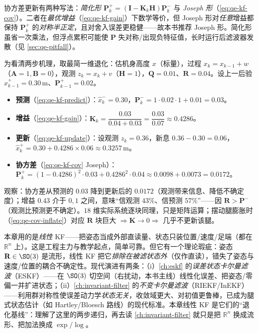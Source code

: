 \begin{note}\label{note:qe-joseph}
协方差更新有两种写法：\emph{简化形} $\mathbf{P}_k^+=(\mathbf{I}-\mathbf{K}_k\mathbf{H})\mathbf{P}_k^-$ 与 \emph{Joseph 形}（\cref{eq:qe-kf-cov}）。二者在\emph{最优增益}（\cref{eq:qe-kf-gain}）下数学等价，但 Joseph 形对\emph{任意}增益都保持 $\mathbf{P}_k^+$ 的\emph{对称半正定}，且对舍入误差更稳健——故本书推荐 Joseph 形。简化形虽省一次乘法，但浮点累积可能使 $\mathbf{P}$ 失对称/出现负特征值，长时运行后滤波器发散（见 \cref{sec:qe-pitfall}）。
\end{note}

\begin{example}\label{exam:qe-kf-step}
为看清两步机理，取最简一维退化：估机身高度 $x$（标量），过程 $x_k=x_{k-1}+w$（$\mathbf{A}=1,\mathbf{B}=0$），观测 $z_k=x_k+v$（$\mathbf{H}=1$），$\mathbf{Q}=0.01$、$\mathbf{R}=0.04$。设上一后验 $\hat x_{k-1}^+=0.30\,\mathrm{m}$、$\mathbf{P}_{k-1}^+=0.02$。
\begin{itemize}
  \item \textbf{预测}（\cref{eq:qe-kf-predict}）：$\hat x_k^-=0.30$，$\mathbf{P}_k^-=1\cdot0.02\cdot1+0.01=0.03$。
  \item \textbf{增益}（\cref{eq:qe-kf-gain}）：$\mathbf{K}_k=\dfrac{0.03}{0.04+0.03}=\dfrac{0.03}{0.07}\approx0.4286$。
  \item \textbf{更新}（\cref{eq:qe-kf-update}）：设观测 $z_k=0.36$，新息 $0.36-0.30=0.06$，$\hat x_k^+=0.30+0.4286\times0.06\approx0.3257\,\mathrm{m}$。
  \item \textbf{协方差}（\cref{eq:qe-kf-cov} Joseph）：$\mathbf{P}_k^+=(1-0.4286)^2\cdot0.03+0.4286^2\cdot0.04\approx0.0098+0.0073=0.0172$。
\end{itemize}
观察：协方差从预测的 $0.03$ 降到更新后的 $0.0172$（观测带来信息、降低不确定度）；增益 $0.43$ 介于 $0,1$ 之间，意味“信观测 $43\%$、信预测 $57\%$”——因 $\mathbf{R}>\mathbf{P}^-$（观测比预测更不确定）。$18$ 维实际系统逐块同理，只是矩阵运算；摆动腿膨胀时（\cref{eq:qe-cov-inflate}）对应 $\mathbf{R}$ 块巨大 $\Rightarrow\mathbf{K}\to0\Rightarrow$ 几乎不更新该腿。
\end{example}

\begin{insight}\label{ins:qe-inekf}
本章用的是\emph{线性} KF——把姿态当成外部直读量、状态只装位置/速度/足端（都在 $\mathbb{R}^n$ 上）。这是工程主力与教学起点，简单可靠。但它有一个理论瑕疵：姿态 $\mathbf{R}\in\SO(3)$ 是流形，线性 KF 把它\emph{排除在被滤状态外}（仅作直读），错失了姿态与速度/位置的耦合不确定性。现代演进有两条：（i）\cref{ch:eskf} 的\emph{误差状态卡尔曼滤波}（ESKF）——在 $\SO(3)$ 切空间（右扰动，本书主线）线性化误差、把姿态/零偏一并扩进状态；（ii）\cref{ch:invariant-filter} 的\emph{不变卡尔曼滤波}（RIEKF/InEKF）——利用群对称性使误差动力学\emph{状态无关}，收敛域更大、对初值更鲁棒，已成为腿式状态估计（如 Hartley/Bloesch 路线\cite{bloesch2013state}）的现代标准。本章线性 KF 是它们的“退化基线”：理解了这里的两步递归，再去读 \cref{ch:invariant-filter} 就只是把 $\mathbb{R}^n$ 换成流形、把加法换成 $\exp/\log$。
\end{insight}

